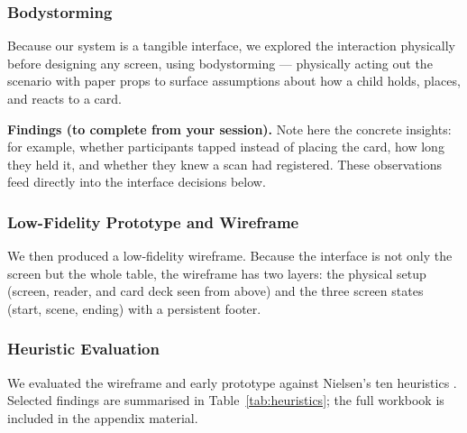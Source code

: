 \subsubsection{Bodystorming}
Because our system is a tangible interface, we explored the interaction
physically before designing any screen, using bodystorming --- physically
acting out the scenario with paper props to surface assumptions about how a
child holds, places, and reacts to a card.


\textbf{Findings (to complete from your session).} Note here the concrete
insights: for example, whether participants tapped instead of placing the
card, how long they held it, and whether they knew a scan had registered.
These observations feed directly into the interface decisions below.

\subsubsection{Low-Fidelity Prototype and Wireframe}
We then produced a low-fidelity wireframe. Because the interface is not only
the screen but the whole table, the wireframe has two layers: the physical
setup (screen, reader, and card deck seen from above) and the three screen
states (start, scene, ending) with a persistent footer.


\subsubsection{Heuristic Evaluation}
We evaluated the wireframe and early prototype against Nielsen's ten
heuristics \cite{nielsen1994heuristics}. Selected findings are summarised in
Table~\ref{tab:heuristics}; the full workbook is included in the appendix
material.

